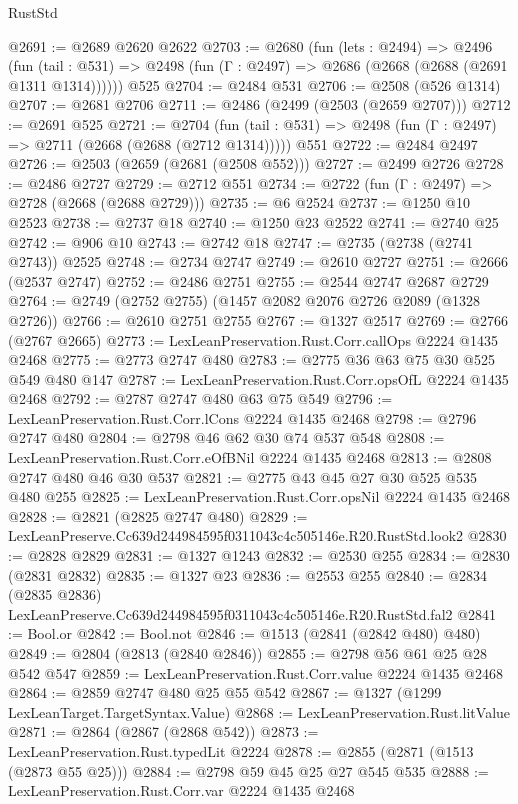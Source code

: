 \begin{lexlean}{RustStd}
\begin{coremodule}
@2691 := @2689 @2620 @2622
@2703 := @2680
    (fun (lets : @2494) =>
    @2496
      (fun (tail : @531) => @2498 (fun (Γ : @2497) => @2686 (@2668 (@2688 (@2691 @1311 @1314))))))
    @525
@2704 := @2484 @531
@2706 := @2508 (@526 @1314)
@2707 := @2681 @2706
@2711 := @2486 (@2499 (@2503 (@2659 @2707)))
@2712 := @2691 @525
@2721 := @2704
    (fun (tail : @531) => @2498 (fun (Γ : @2497) => @2711 (@2668 (@2688 (@2712 @1314)))))
    @551
@2722 := @2484 @2497
@2726 := @2503 (@2659 (@2681 (@2508 @552)))
@2727 := @2499 @2726
@2728 := @2486 @2727
@2729 := @2712 @551
@2734 := @2722 (fun (Γ : @2497) => @2728 (@2668 (@2688 @2729)))
@2735 := @6 @2524
@2737 := @1250 @10 @2523
@2738 := @2737 @18
@2740 := @1250 @23 @2522
@2741 := @2740 @25
@2742 := @906 @10
@2743 := @2742 @18
@2747 := @2735 (@2738 (@2741 @2743)) @2525
@2748 := @2734 @2747
@2749 := @2610 @2727
@2751 := @2666 (@2537 @2747)
@2752 := @2486 @2751
@2755 := @2544 @2747 @2687 @2729
@2764 := @2749 (@2752 @2755) (@1457 @2082 @2076 @2726 @2089 (@1328 @2726))
@2766 := @2610 @2751 @2755
@2767 := @1327 @2517
@2769 := @2766 (@2767 @2665)
@2773 := LexLeanPreservation.Rust.Corr.callOps @2224 @1435 @2468
@2775 := @2773 @2747 @480
@2783 := @2775 @36 @63 @75 @30 @525 @549 @480 @147
@2787 := LexLeanPreservation.Rust.Corr.opsOfL @2224 @1435 @2468
@2792 := @2787 @2747 @480 @63 @75 @549
@2796 := LexLeanPreservation.Rust.Corr.lCons @2224 @1435 @2468
@2798 := @2796 @2747 @480
@2804 := @2798 @46 @62 @30 @74 @537 @548
@2808 := LexLeanPreservation.Rust.Corr.eOfBNil @2224 @1435 @2468
@2813 := @2808 @2747 @480 @46 @30 @537
@2821 := @2775 @43 @45 @27 @30 @525 @535 @480 @255
@2825 := LexLeanPreservation.Rust.Corr.opsNil @2224 @1435 @2468
@2828 := @2821 (@2825 @2747 @480)
@2829 := LexLeanPreserve.Cc639d244984595f0311043c4c505146e.R20.RustStd.look2
@2830 := @2828 @2829
@2831 := @1327 @1243
@2832 := @2530 @255
@2834 := @2830 (@2831 @2832)
@2835 := @1327 @23
@2836 := @2553 @255
@2840 := @2834 (@2835 @2836) LexLeanPreserve.Cc639d244984595f0311043c4c505146e.R20.RustStd.fal2
@2841 := Bool.or
@2842 := Bool.not
@2846 := @1513 (@2841 (@2842 @480) @480)
@2849 := @2804 (@2813 (@2840 @2846))
@2855 := @2798 @56 @61 @25 @28 @542 @547
@2859 := LexLeanPreservation.Rust.Corr.value @2224 @1435 @2468
@2864 := @2859 @2747 @480 @25 @55 @542
@2867 := @1327 (@1299 LexLeanTarget.TargetSyntax.Value)
@2868 := LexLeanPreservation.Rust.litValue
@2871 := @2864 (@2867 (@2868 @542))
@2873 := LexLeanPreservation.Rust.typedLit @2224
@2878 := @2855 (@2871 (@1513 (@2873 @55 @25)))
@2884 := @2798 @59 @45 @25 @27 @545 @535
@2888 := LexLeanPreservation.Rust.Corr.var @2224 @1435 @2468

\end{coremodule}
\end{lexlean}
